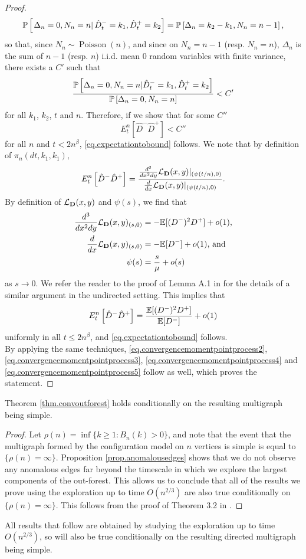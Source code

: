 \begin{proof}
$$\P\left[\left. \Delta_n=0, N_n=n \right| \hat{D}^-_t=k_1,\hat{D}^+_t=k_2\right]=\P\left[ \Delta_n=k_2-k_1, N_n=n-1 \right],$$
so that, since $N_n\sim \operatorname{Poisson}(n)$, and since on $N_n=n-1$ (resp. $N_n=n$),  $\Delta_n$ is the sum of $n-1$ (resp. $n$) i.i.d. mean $0$ random variables with finite variance, there exists a $C'$ such that
$$\frac{\P\left[ \Delta_n=0, N_n=n | \hat{D}^-_t=k_1,\hat{D}^+_t=k_2\right]}{\P\left[ \Delta_n=0, N_n=n\right]}<C'$$
for all $k_1$, $k_2$, $t$ and $n$. Therefore, if we show that for some $C''$ $${E}^n_t\left[\hat{D}^-\hat{D}^+\right]<C''$$ for all $n$ and $t<2n^\beta$,  \eqref{eq.expectationtobound} follows. We note that by definition of $\pi_n(dt,k_1,k_1)$, 
$${E}^n_t\left[\hat{D}^-\hat{D}^+\right]=\frac{\frac{d^3}{dx^2 dy}\cL_{\mathbf{D}}(x,y)|_{(\psi(t/n),0)}}{\frac{d}{dx}\cL_{\mathbf{D}}(x,y)|_{(\psi(t/n),0)}}.$$
By definition of $\cL_{\mathbf{D}}(x,y)$ and $\psi(s)$, we find that 
\begin{align*}\frac{d^3}{dx^2 dy}\cL_{\mathbf{D}}(x,y)_{(s,0)}&=-\E[(D^-)^2D^+]+o(1),\\
\frac{d}{dx}\cL_{\mathbf{D}}(x,y)_{(s,0)}&=-\E[D^-]+o(1)\text{, and}\\
\psi(s)&=\frac{s}{\mu}+o(s)\end{align*}
as $s\to 0$. We refer the reader to the proof of Lemma A.1 in \cite{josephComponentSizesCritical2014} for the details of a similar argument in the undirected setting. This implies that 
$${E}^n_t\left[\hat{D}^-\hat{D}^+\right]=\frac{\E[(D^-)^2D^+]}{\E[D^-]}+o(1)$$
uniformly in all $t\leq 2n^\beta$, and \eqref{eq.expectationtobound} follows. \\
By applying the same techniques, \eqref{eq.convergencemomentpointprocess2}, \eqref{eq.convergencemomentpointprocess3}, \eqref{eq.convergencemomentpointprocess4} and  \eqref{eq.convergencemomentpointprocess5} follow as well, which proves the statement.


\end{proof}
\begin{corollary}
 Theorem \ref{thm.convoutforest} holds conditionally on the resulting multigraph being simple. 
\end{corollary}
\begin{proof}
Let $\rho(n)=\inf\{k\geq 1:B_n(k)>0\}$, and note that the event that the multigraph formed by the configuration model on $n$ vertices is simple is equal to $\{\rho(n)=\infty\}$. Proposition \ref{prop.anomalousedges} shows that we do not observe any anomalous edges far beyond the timescale in which we explore the largest components of the out-forest. This allows us to conclude that all of the results we prove using the exploration up to time $O(n^{2/3})$ are also true conditionally on $\{\rho(n)=\infty\}$. This follows from the proof of Theorem 3.2 in \cite{josephComponentSizesCritical2014}.
\end{proof}
All results that follow are obtained by studying the exploration up to time $O(n^{2/3})$, so will also be true conditionally on the resulting directed multigraph being simple.

